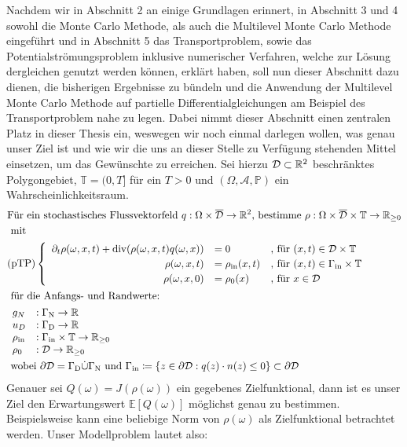 Nachdem wir in Abschnitt 2 an einige Grundlagen erinnert, in Abschnitt 3 und 4 sowohl die Monte Carlo Methode, als auch die Multilevel Monte Carlo Methode eingeführt und in Abschnitt 5 das Transportproblem, sowie das Potentialströmungsproblem inklusive numerischer Verfahren, welche zur Lösung dergleichen genutzt werden können, erklärt haben, soll nun dieser Abschnitt dazu dienen, die bisherigen Ergebnisse zu bündeln und die Anwendung der Multilevel Monte Carlo Methode auf partielle Differentialgleichungen am Beispiel des Transportproblem nahe zu legen. Dabei nimmt dieser Abschnitt einen zentralen Platz in dieser Thesis ein, weswegen wir noch einmal darlegen wollen, was genau unser Ziel ist und wie wir die uns an dieser Stelle zu Verfügung stehenden Mittel einsetzen, um das Gewünschte zu erreichen. Sei hierzu $ \mathcal{ D} \subset \mathbb{R}^2 $ beschränktes Polygongebiet, $ \mathbb{T} = (0,T] $ für ein $ T>0 $ und $ (\Omega,\mathcal{A},\mathbb{P}) $ ein Wahrscheinlichkeitsraum.
\begin{align*}
&\text{Für ein stochastisches Flussvektorfeld } q: \Omega \times \overline{\mathcal{D}} \to \R^2 \text{, bestimme }\rho: \Omega \times \overline{\mathcal{D}} \times \mathbb{T} \to \R_{\geq 0}\\ 
&\text{ mit} \\
&\text{(pTP)} 
\begin{cases}
\begin{array}{rlll}
\partial_t \rho (\omega, x, t) + \dive(\rho(\omega,x,t)q(\omega,x)) &= 0 &\text{, für } (x,t) \in \mathcal{D} \times \mathbb{T} \\
\rho(\omega,x,t) &= \rho_{\text{in}}(x,t) &\text{, für } (x,t) \in \Gamma_{\text{in}} \times \mathbb{T} \\
\rho(\omega,x,0)  &= \rho_0(x) &\text{, für } x \in  \mathcal{D}
\end{array}
\end{cases} \\
&\text{ für die Anfangs- und Randwerte: } \\ 
&\begin{array}{llr}
g_N&: \Gamma_{\text{N}} \to \R \\
u_D&: \Gamma_{\text{D}} \to \R \\
\rho_{\text{in}}&: \Gamma_{\text{in}} \times \mathbb{T} \to \R_{\geq0} \\
\rho_0&: \mathcal{D} \to \R_{\geq0} \\
\end{array} \newline \\
&\text{ wobei } \partial \mathcal{D} = \Gamma_{\text{D}} \dot{\cup} \Gamma_{\text{N}}  \text{ und }  \Gamma_{\text{in}} \coloneqq  \{ z \in \partial \mathcal{D}: q(z)\cdot n(z) \leq 0 \} \subset  \partial \mathcal{D}
\end{align*}
Genauer sei $ Q(\omega) = J(\rho(\omega)) $ ein gegebenes Zielfunktional, dann ist es unser Ziel den Erwartungswert $ \mathbb{E}[Q(\omega)] $ möglichst genau zu bestimmen. Beispielsweise kann eine beliebige Norm von $ \rho(\omega) $ als Zielfunktional betrachtet werden.
Unser Modellproblem lautet also:

